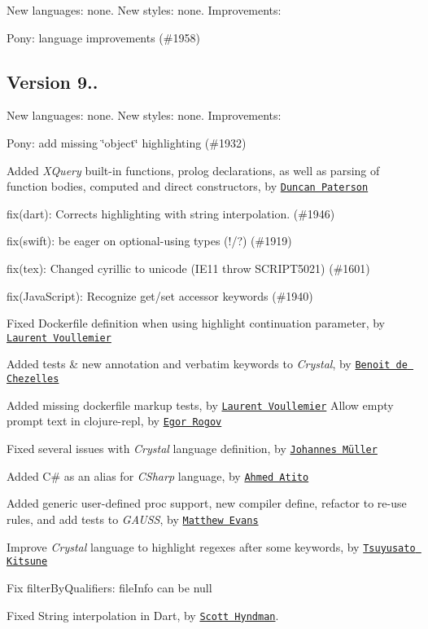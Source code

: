 New languages\+: none. New styles\+: none. Improvements\+:
\begin{DoxyItemize}
\item Pony\+: language improvements (\#1958)
\end{DoxyItemize}

\subsection*{Version 9..}

New languages\+: none. New styles\+: none. Improvements\+:
\begin{DoxyItemize}
\item Pony\+: add missing \char`\"{}object\char`\"{} highlighting (\#1932)
\item Added {\itshape X\+Query} built-\/in functions, prolog declarations, as well as parsing of function bodies, computed and direct constructors, by \href{https://github.com/duncdrum}{\tt Duncan Paterson}
\item fix(dart)\+: Corrects highlighting with string interpolation. (\#1946)
\item fix(swift)\+: be eager on optional-\/using types (!/?) (\#1919)
\item fix(tex)\+: Changed cyrillic to unicode (I\+E11 throw S\+C\+R\+I\+P\+T5021) (\#1601)
\item fix(\+Java\+Script)\+: Recognize get/set accessor keywords (\#1940)
\item Fixed Dockerfile definition when using highlight continuation parameter, by \href{https://github.com/l-vo}{\tt Laurent Voullemier}
\item Added tests \& new {\ttfamily annotation} and {\ttfamily verbatim} keywords to {\itshape Crystal}, by \href{https://github.com/bew}{\tt Benoit de Chezelles}
\item Added missing dockerfile markup tests, by \href{https://github.com/l-vo}{\tt Laurent Voullemier} Allow empty prompt text in clojure-\/repl, by \href{https://github.com/egor-rogov}{\tt Egor Rogov}
\item Fixed several issues with {\itshape Crystal} language definition, by \href{https://github.com/straight-shoota}{\tt Johannes Müller}
\item Added {\ttfamily C\#} as an alias for {\itshape C\+Sharp} language, by \href{https://github.com/atitoa93}{\tt Ahmed Atito}
\item Added generic user-\/defined proc support, new compiler define, refactor to re-\/use rules, and add tests to {\itshape G\+A\+U\+SS}, by \href{https://github.com/matthewevans}{\tt Matthew Evans}
\item Improve {\itshape Crystal} language to highlight regexes after some keywords, by \href{https://github.com/MakeNowJust}{\tt Tsuyusato Kitsune}
\item Fix filter\+By\+Qualifiers\+: file\+Info can be null
\item Fixed String interpolation in Dart, by \href{https://github.com/shyndman}{\tt Scott Hyndman}.
\end{DoxyItemize}

